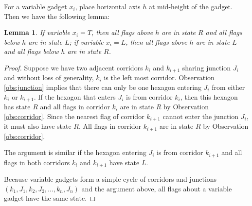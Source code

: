 \documentclass[10pt]{CSUNthesis}
\theoremstyle{plain}%
\newtheorem{lem}{Lemma}
\theoremstyle{definition}
\theoremstyle{remark}
\newcommand{\lr}[1]{\left( #1 \right)}
\begin{document}
For a variable gadget $x_i$, place horizontal axis $h$ at mid-height of the gadget.
Then we have the following lemma:
\begin{lem}\label{lem:aux-2}
If variable $x_i = T$, then all flags above $h$ are in state $R$ and all flags below $h$ are in state $L$; if variable $x_i = L$, then all flags above $h$ are in state $L$ and all flags below $h$ are in state $R$.    
\end{lem}
\begin{proof}
Suppose we have two adjacent corridors $k_i$ and $k_{i+1}$ sharing junction $J_i$ and without loss of generality, $k_i$ is the left most corridor.
Observation \ref{obs:junction} implies that there can only be one hexagon entering $J_i$ from either $k_i$ or $k_{i+1}$. If the hexagon that enters $J_i$ is from corridor $k_i$, then this hexagon has state $R$ and all flags in corridor $k_i$ are in state $R$ by Observation \ref{obs:corridor}. 
Since the nearest flag of corridor $k_{i+1}$ cannot enter the junction $J_i$, it must also have state $R$.  
All flags in corridor $k_{i+1}$ are in state $R$ by Observation \ref{obs:corridor}. 

The argument is similar if the hexagon entering $J_i$ is from corridor $k_{i+1}$ and all flags in both corridors $k_i$ and $k_{i+1}$ have state $L$.

Because variable gadgets form a simple cycle of corridors and junctions $\lr{k_1, J_1, k_2, J_2, \dots, k_n, J_n}$ and the argument above, all flags about a variable gadget have the same state.
\end{proof}
\end{document}
